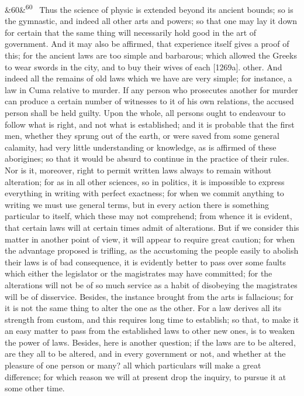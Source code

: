 \documentclass[12pt]{article}
\newcommand{\para}[1][]{\par\noindent\ifx&#1&\else\textsuperscript{\footnotesize #1}~\fi}
\begin{document}
\para[60] Thus the science of physic is extended beyond its ancient bounds; so is the gymnastic, and indeed all other arts and powers; so that one may lay it down for certain that the same thing will necessarily hold good in the art of government. And it may also be affirmed, that experience itself gives a proof of this; for the ancient laws are too simple and barbarous; which allowed the Greeks to wear swords in the city, and to buy their wives of each [1269a]. other. And indeed all the remains of old laws which we have are very simple; for instance, a law in Cuma relative to murder. If any person who prosecutes another for murder can produce a certain number of witnesses to it of his own relations, the accused person shall be held guilty. Upon the whole, all persons ought to endeavour to follow what is right, and not what is established; and it is probable that the first men, whether they sprung out of the earth, or were saved from some general calamity, had very little understanding or knowledge, as is affirmed of these aborigines; so that it would be absurd to continue in the practice of their rules. Nor is it, moreover, right to permit written laws always to remain without alteration; for as in all other sciences, so in politics, it is impossible to express everything in writing with perfect exactness; for when we commit anything to writing we must use general terms, but in every action there is something particular to itself, which these may not comprehend; from whence it is evident, that certain laws will at certain times admit of alterations. But if we consider this matter in another point of view, it will appear to require great caution; for when the advantage proposed is trifling, as the accustoming the people easily to abolish their laws is of bad consequence, it is evidently better to pass over some faults which either the legislator or the magistrates may have committed; for the alterations will not be of so much service as a habit of disobeying the magistrates will be of disservice. Besides, the instance brought from the arts is fallacious; for it is not the same thing to alter the one as the other. For a law derives all its strength from custom, and this requires long time to establish; so that, to make it an easy matter to pass from the established laws to other new ones, is to weaken the power of laws. Besides, here is another question; if the laws are to be altered, are they all to be altered, and in every government or not, and whether at the pleasure of one person or many? all which particulars will make a great difference; for which reason we will at present drop the inquiry, to pursue it at some other time.
\end{document}
